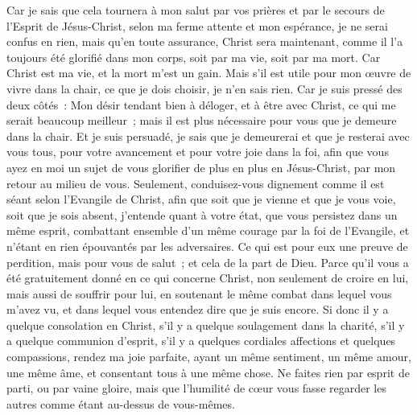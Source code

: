 \begin{multicols}{2}
Car je sais que cela tournera à mon salut par vos prières et par le secours de l'Esprit de Jésus-Christ,
selon ma ferme attente et mon espérance, je ne serai confus en rien, mais qu'en toute assurance, Christ sera maintenant, comme il l'a toujours été glorifié dans mon corps, soit par ma vie, soit par ma mort.
Car Christ est ma vie, et la mort m'est un gain.
Mais s'il est utile pour mon œuvre de vivre dans la chair, ce que je dois choisir, je n'en sais rien.
Car je suis pressé des deux côtés~: Mon désir tendant bien à déloger, et à être avec Christ, ce qui me serait beaucoup meilleur~;
mais il est plus nécessaire pour vous que je demeure dans la chair.
Et je suis persuadé, je sais que je demeurerai et que je resterai avec vous tous, pour votre avancement et pour votre joie dans la foi,
afin que vous ayez en moi un sujet de vous glorifier de plus en plus en Jésus-Christ, par mon retour au milieu de vous. 
Seulement, conduisez-vous dignement comme il est séant selon l'Evangile de Christ, afin que soit que je vienne et que je vous voie, soit que je sois absent, j'entende quant à votre état, que vous persistez dans un même esprit, combattant ensemble d'un même courage par la foi de l'Evangile, et n'étant en rien épouvantés par les adversaires.
Ce qui est pour eux une preuve de perdition, mais pour vous de salut~; et cela de la part de Dieu.
Parce qu'il vous a été gratuitement donné en ce qui concerne Christ, non seulement de croire en lui, mais aussi de souffrir pour lui,
en soutenant le même combat dans lequel vous m'avez vu, et dans lequel vous entendez dire que je suis encore.
\VerseOne{}Si donc il y a quelque consolation en Christ, s'il y a quelque soulagement dans la charité, s'il y a quelque communion d'esprit, s'il y a quelques cordiales affections et quelques compassions,
rendez ma joie parfaite, ayant un même sentiment, un même amour, une même âme, et consentant tous à une même chose.
Ne faites rien par esprit de parti, ou par vaine gloire, mais que l'humilité de cœur vous fasse regarder les autres comme étant au-dessus de vous-mêmes.

\end{multicols}
